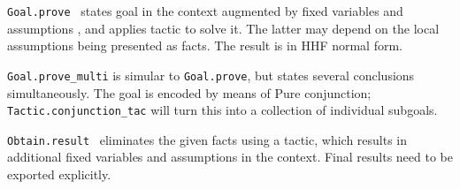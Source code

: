\begin{isabellebody}
\begin{isamarkuptext}
\begin{description}
  \item \verb|Goal.prove|~ states goal  in the context augmented by fixed variables  and
  assumptions , and applies tactic  to solve
  it.  The latter may depend on the local assumptions being presented
  as facts.  The result is in HHF normal form.

  \item \verb|Goal.prove_multi| is simular to \verb|Goal.prove|, but
  states several conclusions simultaneously.  The goal is encoded by
  means of Pure conjunction; \verb|Tactic.conjunction_tac| will turn
  this into a collection of individual subgoals.

  \item \verb|Obtain.result|~ eliminates the
  given facts using a tactic, which results in additional fixed
  variables and assumptions in the context.  Final results need to be
  exported explicitly.

  \end{description}%
\end{isamarkuptext}%
\isamarkuptrue%
%
\endisatagmlref
{\isafoldmlref}%
%
\isadelimmlref
%
\endisadelimmlref
%
\isadelimtheory
%
\endisadelimtheory
%
\isatagtheory
{}\isamarkupfalse%
%
\endisatagtheory
{\isafoldtheory}%
%
\isadelimtheory
%
\endisadelimtheory
\isanewline
\end{isabellebody}%
